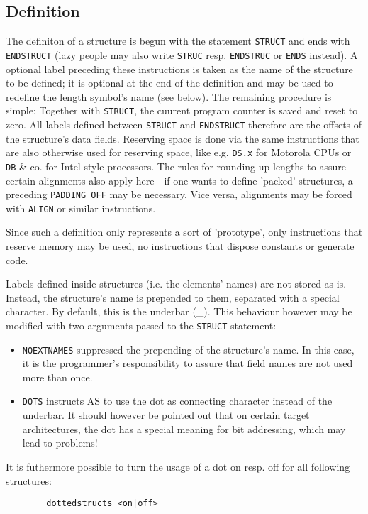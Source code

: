 \documentclass[12pt,twoside]{report}
\newcommand{\tty}[1]{{\tt #1}}
\newcommand{\asname}{{AS}}
\begin{document}
\subsection{Definition}

The definiton of a structure is begun with the statement
\tty{STRUCT} and ends with \tty{ENDSTRUCT} (lazy people may also
write {\tt STRUC} resp.  {\tt ENDSTRUC} or {\tt ENDS} instead).
A optional label preceding these instructions is taken as the
name of the structure to be defined; it is optional at the end of
the definition and may be used to redefine the length symbol's
name (see below).  The remaining procedure is simple: Together
with \tty{STRUCT}, the cuurent program counter is saved and reset
to zero.  All labels defined between \tty{STRUCT} and
\tty{ENDSTRUCT} therefore are the offsets of the structure's data
fields.  Reserving space is done via the same instructions that
are also otherwise used for reserving space, like e.g.
\tty{DS.x} for Motorola CPUs or \tty{DB} \& co.  for Intel-style
processors.  The rules for rounding up lengths to assure certain
alignments also apply here - if one wants to define 'packed'
structures, a preceding {\tt PADDING OFF} may be necessary.  Vice
versa, alignments may be forced with {\tt ALIGN} or similar
instructions.

Since such a definition only represents a sort of 'prototype', only
instructions that reserve memory may be used, no instructions that dispose
constants or generate code.

Labels defined inside structures (i.e. the elements' names) are not
stored as-is.  Instead, the structure's name is prepended to them,
separated with a special character.  By default, this is the underbar
(\_).  This behaviour however may be modified with two arguments passed
to the
\tty{STRUCT} statement:
\begin{itemize}
\item{\tty{NOEXTNAMES} suppressed the prepending of the structure's name.
      In this case, it is the programmer's responsibility to assure that
      field names are not used more than once.}
\item{\tty{DOTS} instructs \asname{} to use the dot as connecting character
      instead of the underbar.  It should however be pointed out that
      on certain target architectures, the dot has a special meaning
      for bit addressing, which may lead to problems!}
\end{itemize}
It is futhermore possible to turn the usage of a dot on resp. off for all
following structures:
\begin{verbatim}
        dottedstructs <on|off>
\end{verbatim}
\end{document}
